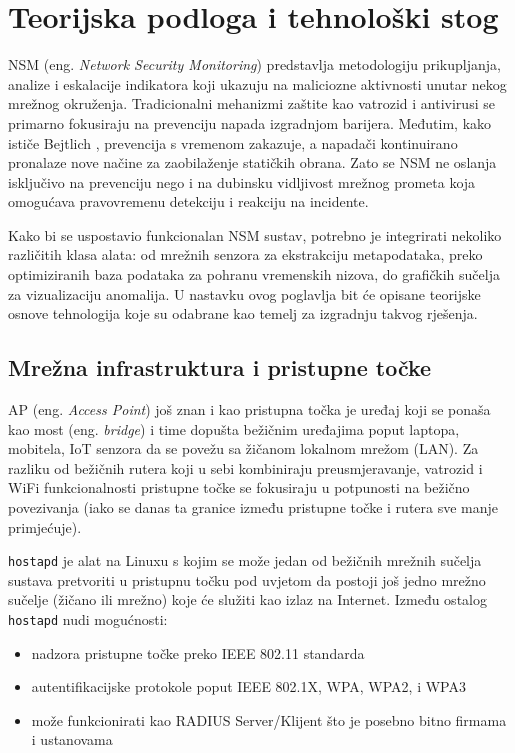 \chapter{Teorijska podloga i tehnološki stog}
NSM (eng. \textit{Network Security Monitoring}) predstavlja metodologiju prikupljanja, analize i eskalacije indikatora koji ukazuju na maliciozne aktivnosti unutar nekog mrežnog okruženja. 
Tradicionalni mehanizmi zaštite kao vatrozid i antivirusi se primarno fokusiraju na prevenciju napada izgradnjom barijera. Međutim, kako ističe 
Bejtlich \cite{bejtlich_nsm}, prevencija s vremenom zakazuje, a napadači kontinuirano pronalaze nove načine za zaobilaženje statičkih obrana.
Zato se NSM ne oslanja isključivo na prevenciju nego i na dubinsku vidljivost mrežnog prometa koja omogućava pravovremenu detekciju i reakciju na incidente.

Kako bi se uspostavio funkcionalan NSM sustav, potrebno je integrirati nekoliko različitih klasa alata: od mrežnih senzora za ekstrakciju metapodataka, preko optimiziranih baza podataka za 
pohranu vremenskih nizova, do grafičkih sučelja za vizualizaciju anomalija. 
U nastavku ovog poglavlja bit će opisane teorijske osnove tehnologija koje su odabrane kao temelj za izgradnju takvog rješenja.

\section{Mrežna infrastruktura i pristupne točke}
AP (eng. \textit{Access Point}) još znan i kao pristupna točka je uređaj koji se ponaša kao most (eng. \textit{bridge}) i time dopušta bežičnim uređajima poput laptopa, mobitela, IoT senzora 
da se povežu sa žičanom lokalnom mrežom (LAN). Za razliku od bežičnih rutera koji u sebi kombiniraju preusmjeravanje, vatrozid i WiFi funkcionalnosti pristupne točke se fokusiraju u potpunosti 
na bežično povezivanja (iako se danas ta granice između pristupne točke i rutera sve manje primjećuje).

\texttt{hostapd} je alat na Linuxu s kojim se može jedan od bežičnih mrežnih sučelja sustava pretvoriti u pristupnu točku \cite{hostapd_docs} pod uvjetom da postoji još jedno mrežno sučelje (žičano ili mrežno) 
koje će služiti kao izlaz na Internet. Između ostalog \texttt{hostapd} nudi mogućnosti:
\begin{itemize}
    \item nadzora pristupne točke preko IEEE 802.11 standarda
    \item autentifikacijske protokole poput IEEE 802.1X, WPA, WPA2, i WPA3
    \item može funkcionirati kao RADIUS Server/Klijent što je posebno bitno firmama i ustanovama
\end{itemize}

